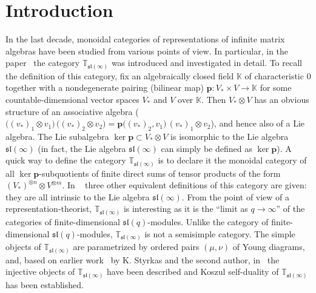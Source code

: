 \documentclass[11pt]{article}
\theoremstyle{plain}
\theoremstyle{nonumberplain}
\theoremstyle{plain}
\theoremstyle{nonumberplain}
\newcommand\fsl{\mathfrak{sl}}
\begin{document}


\section*{Introduction}\label{se.intro}

In the last decade, monoidal categories of representations of infinite
matrix algebras have been studied from various points of view.  In
particular, in the paper~\cite{DPS} the category
$\mathbb{T}_{\fsl(\infty)}$ was introduced and investigated in detail.
To recall the definition of this category, fix an algebraically closed
field $\mathbb{K}$ of characteristic $0$ together with a nondegenerate
pairing (bilinear map) $\mathbf{p}:V_*\times V\to\mathbb{K}$ for some
countable-dimensional vector spaces $V_*$ and $V$ over $\mathbb{K}$.
Then $V_*\otimes V$ has an obvious structure of an associative algebra
($\big(\left(v_*\right)_1\otimes
v_1\big)\,\big(\left(v_*\right)_2\otimes
v_2\big)=\mathbf{p}\big(\left(v_*\right)_2,v_1\big)\,\left(v_*\right)_1\otimes
v_2$), and hence also of a Lie algebra.  The Lie subalgebra
$\ker\mathbf{p}\subset V_*\otimes V$ is isomorphic to the Lie algebra
$\fsl(\infty)$ (in fact, the Lie algebra $\fsl(\infty)$ can simply be
defined as $\ker\mathbf{p}$).  A quick way to define the category
$\mathbb{T}_{\fsl(\infty)}$ is to declare it the monoidal category of
all $\ker\mathbf{p}$-subquotients of finite direct sums of tensor
products of the form
$\left(V_*\right)^{\otimes n}\otimes V^{\otimes m}$.  In ~\cite{DPS}
three other equivalent definitions of this category are given: they
are all intrinsic to the Lie algebra $\fsl(\infty)$.  From the point
of view of a representation-theorist, $\mathbb{T}_{\fsl(\infty)}$ is
interesting as it is the ``limit as $q\to\infty$'' of the categories
of finite-dimensional $\fsl(q)$-modules.  Unlike the category of
finite-dimensional $\fsl(q)$-modules, $\mathbb{T}_{\fsl(\infty)}$ is
not a semisimple category.  The simple objects of
$\mathbb{T}_{\fsl(\infty)}$ are parametrized by ordered pairs
$(\mu,\nu)$ of Young diagrams, and, based on earlier work~\cite{PS} by
K. Styrkas and the second author, in~\cite{DPS} the injective objects
of $\mathbb{T}_{\fsl(\infty)}$ have been described and Koszul
self-duality of $\mathbb{T}_{\fsl(\infty)}$ has been established.
\end{document}
